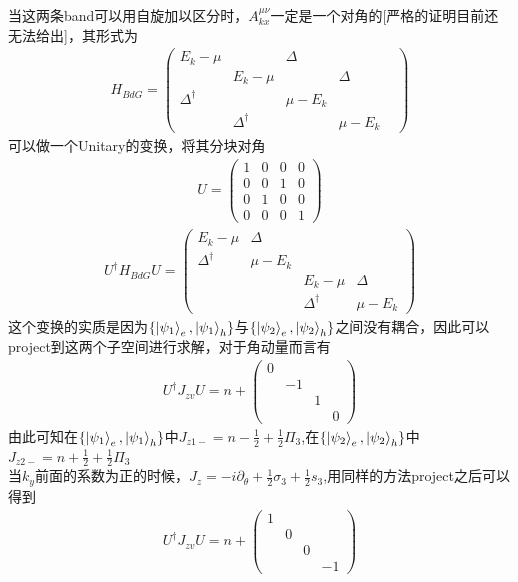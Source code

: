 \documentclass[22pt]{article}
\begin{document}
当这两条band可以用自旋加以区分时，$A_{kx}^{\mu\nu}$一定是一个对角的[严格的证明目前还无法给出]，其形式为
\begin{align}
	H_{BdG}=
	\begin{pmatrix}
		E_k-\mu & &\Delta  &\\
		& E_k-\mu& & \Delta &\\
		\Delta^{\dagger} &    & \mu-E_k &\\
		& \Delta^{\dagger} && \mu-E_k
	\end{pmatrix}
\end{align}
可以做一个Unitary的变换，将其分块对角
\begin{align}
	U=
	\begin{pmatrix}
		1&0&0&0\\
		0&0&1&0\\
		0&1&0&0\\
		0&0&0&1
	\end{pmatrix}
\end{align}
\begin{align}
	U^{\dagger}H_{BdG}U=
	\begin{pmatrix}
		E_k-\mu &\Delta &&\\
		\Delta^{\dagger} &\mu-E_k &&\\
		&& E_k-\mu &\Delta \\
		&&\Delta^{\dagger}& \mu-E_k
	\end{pmatrix}
\end{align}
这个变换的实质是因为$\{\ket{\psi_1}_e,\ket{
\psi_1}_h\}$与$\{\ket{\psi_2}_e,\ket{
\psi_2}_h\}$之间没有耦合，因此可以project到这两个子空间进行求解，对于角动量而言有
\begin{align}
	U^{\dagger}J_{zv}U=n+
	\begin{pmatrix}
		0&&&\\
		&-1&&\\
		&&1&\\
		&&&0
	\end{pmatrix}
\end{align}
由此可知在$\{\ket{\psi_1}_e,\ket{\psi_1}_h\}$中$J_{z1-}=n-\frac{1}{2}+\frac{1}{2}\Pi_3$,在$\{\ket{\psi_2}_e,\ket{\psi_2}_h\}$中$J_{z2-}=n+\frac{1}{2}+\frac{1}{2}\Pi_3$
\\
当$k_y$前面的系数为正的时候，$J_z=-i\partial_{\theta}+\frac{1}{2}\sigma_3+\frac{1}{2}s_3$,用同样的方法project之后可以得到
\begin{align}
	U^{\dagger}J_{zv}U=n
	+
	\begin{pmatrix}
		1&&&\\
		&0&&\\
		&&0&\\
		&&&-1
	\end{pmatrix}
\end{align}
\end{document}
